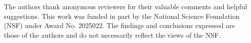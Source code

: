 \begin{acks}
The authors thank anonymous reviewers for their valuable comments and helpful suggestions.
This work was funded in part by the National Science Foundation (NSF) under Award No. 2025022. The findings and conclusions expressed are those of the authors and do not necessarily reflect the views of the NSF.
\end{acks}